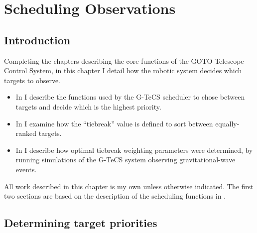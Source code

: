 
\chapter{Scheduling Observations}
\label{chap:scheduling}


\chaptoc{}


\section{Introduction}
\label{sec:scheduling_intro}


\begin{colsection}

Completing the chapters describing the core functions of the GOTO Telescope Control System, in this chapter I detail how the robotic system decides which targets to observe.
%
\begin{itemize}
    \item In  I describe the functions used by the G\nobreakdash-TeCS scheduler to chose between targets and decide which is the highest priority.
    \item In  I examine how the ``tiebreak'' value is defined to sort between equally-ranked targets.
    \item In  I describe how optimal tiebreak weighting parameters were determined, by running simulations of the G-TeCS system observing gravitational-wave events.
\end{itemize}
%
All work described in this chapter is my own unless otherwise indicated. The first two sections are based on the description of the scheduling functions in \citet{Dyer}.

\end{colsection}


\section{Determining target priorities}
\label{sec:ranking}



